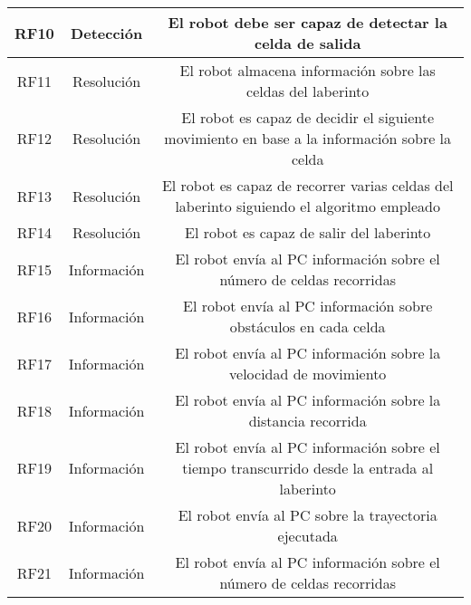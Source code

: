 \begin{center}
\begin{table}[h!]
\begin{adjustbox}{max width=\textwidth}
\begin{tabular}{|c|c|c|}
    RF10 & Detección & El robot debe ser capaz de detectar la celda de salida \\ \hline
    \rowcolor{red!20}

    RF11 & Resolución & El robot almacena información sobre las celdas del laberinto \\ \hline
    \rowcolor{yellow!40}

    RF12 & Resolución & El robot es capaz de decidir el siguiente movimiento en base a la información sobre la celda \\ \hline
    \rowcolor{yellow!40}

    RF13 & Resolución & El robot es capaz de recorrer varias celdas del laberinto siguiendo el algoritmo empleado \\ \hline
    \rowcolor{yellow!40}


    RF14 & Resolución & El robot es capaz de salir del laberinto \\ \hline
    \rowcolor{green!20}

    RF15 & Información & El robot envía al PC información sobre el número de celdas recorridas \\ \hline

    \rowcolor{green!20}

    RF16 & Información & El robot envía al PC información sobre obstáculos en cada celda \\ \hline

    \rowcolor{green!20}

    RF17 & Información & El robot envía al PC información sobre la velocidad de movimiento \\ \hline

    \rowcolor{green!20}

    RF18 & Información & El robot envía al PC información sobre la distancia recorrida \\ \hline

    \rowcolor{green!20}

    RF19 & Información & El robot envía al PC información sobre el tiempo transcurrido desde la entrada al laberinto \\ \hline

    \rowcolor{green!20}

    RF20 & Información & El robot envía al PC sobre la trayectoria ejecutada  \\ \hline

    \rowcolor{green!20}

    RF21 & Información & El robot envía al PC información sobre el número de celdas recorridas \\ \hline


\end{tabular}
\end{adjustbox}
\end{table}
\end{center}
